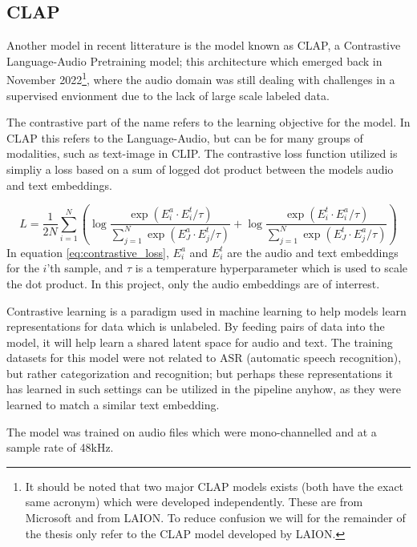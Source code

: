 \subsection{CLAP}

Another model in recent litterature is the model known as CLAP, a Contrastive Language-Audio Pretraining model; this architecture which emerged back in November 2022\footnote{It should be noted that two major CLAP models exists (both have the exact same acronym) which were developed independently. These are from Microsoft and from LAION. To reduce confusion we will for the remainder of the thesis only refer to the CLAP model developed by LAION.}, where the audio domain was still dealing with challenges in a supervised envionment due to the lack of large scale labeled data.\cite{elizalde_clap_2022}\cite{wu_large-scale_2024}

The contrastive part of the name refers to the learning objective for the model. In CLAP this refers to the Language-Audio, but can be for many groups of modalities, such as text-image in CLIP. The contrastive loss function utilized is simpliy a loss based on a sum of logged dot product between the models audio and text embeddings.

\begin{equation}
    L = \frac{1}{2N} \sum_{i=1}^{N} \left( \log \frac{\exp(E_i^a\cdot E_i^t / \tau)}{\sum_{j=1}^{N} \exp(E_J^a \cdot E_j^t / \tau)} + \log \frac{\exp(E_i^t\cdot E_i^a / \tau)}{\sum_{j=1}^{N} \exp(E_J^t \cdot E_j^a / \tau)} \right)
    \label{eq:contrastive_loss}
\end{equation}
In equation \ref{eq:contrastive_loss},  $E_i^a$ and $E_i^t$ are the audio and text embeddings for the $i$'th sample, and $\tau$ is a temperature hyperparameter which is used to scale the dot product. In this project, only the audio embeddings are of interrest.

Contrastive learning is a paradigm used in machine learning to help models learn representations for data which is unlabeled. By feeding pairs of data into the model, it will help learn a shared latent space for audio and text. The training datasets for this model were not related to ASR (automatic speech recognition), but rather categorization and recognition; but perhaps these representations it has learned in such settings can be utilized in the pipeline anyhow, as they were learned to match a similar text embedding.

The model was trained on audio files which were mono-channelled and at a sample rate of 48kHz.\cite{wu_large-scale_2024}
